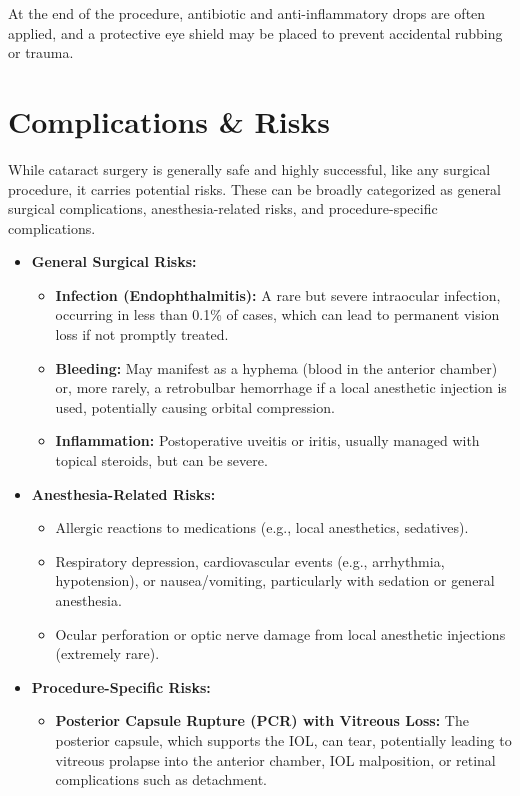 At the end of the procedure, antibiotic and anti-inflammatory drops are often applied, and a protective eye shield may be placed to prevent accidental rubbing or trauma.

\section*{Complications \& Risks}
While cataract surgery is generally safe and highly successful, like any surgical procedure, it carries potential risks. These can be broadly categorized as general surgical complications, anesthesia-related risks, and procedure-specific complications.

\begin{itemize}
  \item \textbf{General Surgical Risks:}
    \begin{itemize}
      \item \textbf{Infection (Endophthalmitis):} A rare but severe intraocular infection, occurring in less than 0.1\% of cases, which can lead to permanent vision loss if not promptly treated.
      \item \textbf{Bleeding:} May manifest as a hyphema (blood in the anterior chamber) or, more rarely, a retrobulbar hemorrhage if a local anesthetic injection is used, potentially causing orbital compression.
      \item \textbf{Inflammation:} Postoperative uveitis or iritis, usually managed with topical steroids, but can be severe.
    \end{itemize}
  \item \textbf{Anesthesia-Related Risks:}
    \begin{itemize}
      \item Allergic reactions to medications (e.g., local anesthetics, sedatives).
      \item Respiratory depression, cardiovascular events (e.g., arrhythmia, hypotension), or nausea/vomiting, particularly with sedation or general anesthesia.
      \item Ocular perforation or optic nerve damage from local anesthetic injections (extremely rare).
    \end{itemize}
  \item \textbf{Procedure-Specific Risks:}
    \begin{itemize}
      \item \textbf{Posterior Capsule Rupture (PCR) with Vitreous Loss:} The posterior capsule, which supports the IOL, can tear, potentially leading to vitreous prolapse into the anterior chamber, IOL malposition, or retinal complications such as detachment.

\end{itemize}
\end{itemize}
